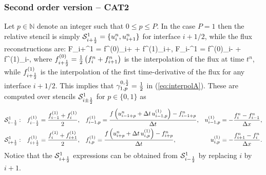\subsubsection{Second order version -- CAT2}
Let $p\in \mathbb{N}$ denote an integer such that $0 \leq p \leq P$. 
In the case $P=1$ then the relative stencil is simply $\mathcal{S}^1_{i+\frac{1}{2}} = \{u_i^n,u_{i+1}^n\}$ for interface $i+1/2$,
while the flux reconstructions are:
\bea \label{eq:fluxCAT2}
	F_{i+\ha}^1 = f^{(0)}_{i+\ha} + f^{(1)}_{i+\ha}, \qquad
	F_{i-\ha}^1 = f^{(0)}_{i-\ha} + f^{(1)}_{i-\ha},
\eea
where $f^{(0)}_{i+\frac{1}{2}} = \frac{1}{2}\left(f_i^n + f_{i+1}^n\right)$ 
is the interpolation of the flux at time $t^n$, while
$f^{(1)}_{i+\frac{1}{2}}$  %
is the interpolation of the first time-derivative of the flux for any interface $i+1/2$.
This implies that $\gamma_{1,p}^{0,\frac{1}{2}}=\frac{1}{2}$ in (\ref{eq:interpolA}).
These are computed over stencils $\mathcal{S}_{i\pm\frac{1}{2}}^1$ for
$p\in \{ 0,1 \}$ as
\begin{align}
\nonumber
\mathcal{S}_{i-\frac{1}{2}}^1 &:&
f^{(1)}_{i-\frac{1}{2}} = \frac{f_{i-1}^{(1)}+f_i^{(1)} }{2}, \quad 
&f_{i-1,p}^{(1)} = \frac{f\left( u_{i-1+p}^n + \Delta t \, u_{i-1,p}^{(1)}\right) - f_{i-1+p}^n}{\Delta t}, 
 & u_{i-1,p}^{(1)} = -\frac{f_{i}^n - f_{i-1}^n}{\Delta x},\\
\nonumber
\mathcal{S}_{i+\frac{1}{2}}^1 &:& 
f^{(1)}_{i+\frac{1}{2}} = \frac{f_i^{(1)} + f_{i+1}^{(1)}}{2}, \quad 
&f_{i,p}^{(1)} = \frac{f\left( u_{i+p}^n + \Delta t \, u_{i,p}^{(1)}\right) - f_{i+p}^n}{\Delta t}, 
 &  u_{i,p}^{(1)} = -\frac{f_{i+1}^n - f_{i}^n}{\Delta x}.
\end{align}
Notice that the $\mathcal{S}_{i+\frac{1}{2}}^1$ expressions can be obtained from $\mathcal{S}_{i-\frac{1}{2}}^1$ by replacing $i$ by $i+1$.
